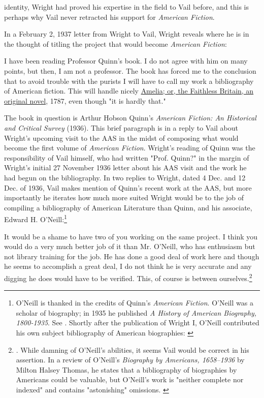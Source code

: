 identity, Wright had proved his expertise in the field to Vail before, and this is perhaps why Vail never retracted his support for \textit{American Fiction}.

In a February 2, 1937 letter from Wright to Vail, Wright reveals where he is in the thought of titling the project that would become \textit{American Fiction}: 

\begin{displayquote}
I have been reading Professor Quinn's book. I do not agree with him on many points, but then, I am not a professor. The book has forced me to the conclusion that to avoid trouble with the purists I will have to call my work a bibliography of American fiction. This will handle nicely \underline{Amelia; or, the Faithless Britain, an original novel}, 1787, even though "it is hardly that." \autocite{lyle_h._wright_letter_1937}
\end{displayquote}

The book in question is Arthur Hobson Quinn's \textit{American Fiction: An Historical and Critical Survey} (1936). This brief paragraph is in a reply to Vail about Wright's upcoming visit to the AAS in the midst of composing what would become the first volume of \textit{American Fiction}. Wright's reading of Quinn was the responsibility of Vail himself, who had written "Prof. Quinn?" in the margin of Wright's initial 27 November 1936 letter about his AAS visit and the work he had begun on the bibliography. In two replies to Wright, dated 4 Dec. and 12 Dec. of 1936, Vail makes mention of Quinn's recent work at the AAS, but more importantly he iterates how much more suited Wright would be to the job of compiling a bibliography of American Literature than Quinn, and his associate, Edward H. O'Neill:\footnote{\autocite{robert_g._vail_letter_1936-1,robert_g._vail_letter_1936} O'Neill is thanked in the credits of Quinn's \textit{American Fiction}. O'Neill was a scholar of biography; in 1935 he published \textit{A History of American Biography, 1800-1935}. See \autocite{oneill_history_1935}. Shortly after the publication of Wright I, O'Neill contributed his own subject bibliography of American biographies: \autocite{oneill_biography_1939}}
\begin{displayquote}
It would be a shame to have two of you working on the same project. I think you would do a very much better job of it than Mr. O'Neill, who has enthusiasm but not library training for the job. He has done a good deal of work here and though he seems to accomplish a great deal, I do not think he is very accurate and any digging he does would have to be verified. This, of course is between ourselves.\footnote{\autocite{robert_g._vail_letter_1936}. While damning of O'Neill's abilities, it seems Vail would be correct in his assertion. In a review of O'Neill's \textit{Biography by Americans, 1658–1936} by Milton Halsey Thomas, he states that a bibliography of biographies by Americans could be valuable, but O'Neill's work is "neither complete nor indexed" and contains "astonishing" omissions. \autocite{thomas_biography_1940}}
\end{displayquote}

